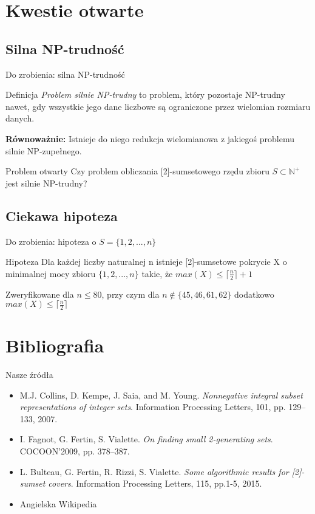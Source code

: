 \documentclass{beamer}
\newcommand{\N}{\mathbb{N}}
\begin{document}
\section{Kwestie otwarte}
	\subsection{Silna NP-trudność}
		\begin{frame}{Do zrobienia: silna NP-trudność}
			\begin{block}{Definicja}
				\emph{Problem silnie NP-trudny} to problem, który pozostaje NP-trudny nawet, gdy wszystkie jego dane liczbowe są ograniczone przez wielomian rozmiaru danych.
				
				\pause \textbf{Równoważnie:} Istnieje do niego redukcja wielomianowa z jakiegoś problemu silnie NP-zupełnego.
			\end{block}				
			
			\pause
			\begin{alertblock}{Problem otwarty}
				Czy problem obliczania [2]-sumsetowego rzędu zbioru $ S \subset \N^{+} $ jest silnie NP-trudny?
			\end{alertblock}
		\end{frame}
		
	\subsection{Ciekawa hipoteza}
		\begin{frame}{Do zrobienia: hipoteza o $ S = \lbrace 1,2,...,n \rbrace $}
			\begin{alertblock}{Hipoteza}
				Dla każdej liczby naturalnej n istnieje [2]-sumsetowe pokrycie X o minimalnej mocy zbioru $ \lbrace 1,2,...,n \rbrace $ takie, że $ max(X) \leq \lceil \frac{n}{2} \rceil + 1 $
			\end{alertblock}
			
			\pause
			\vspace{\baselineskip}
			Zweryfikowane dla $ n \leq 80 $, przy czym dla $ n \notin \lbrace 45,46,61,62 \rbrace $ dodatkowo $ max(X) \leq \lceil \frac{n}{2} \rceil $
		\end{frame}

\section{Bibliografia}
	\begin{frame}{Nasze źródła}
		\begin{itemize}
			\item M.J. Collins, D. Kempe, J. Saia, and M. Young. \textit{Nonnegative integral
subset representations of integer sets}. Information Processing Letters, 101, pp. 129–133, 2007.
			\item I. Fagnot, G. Fertin, S. Vialette. \textit{On finding small 2-generating sets}. COCOON'2009, pp. 378–387.
			\item L. Bulteau, G. Fertin, R. Rizzi, S. Vialette. \textit{Some algorithmic results
for [2]-sumset covers}. Information Processing Letters, 115, pp.1-5, 2015.
			\item Angielska Wikipedia
		\end{itemize}
	\end{frame}
	
\end{document}
